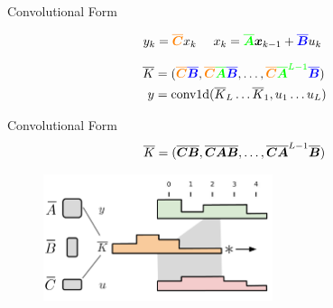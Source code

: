 \begin{frame}{Convolutional Form}

    \begin{align*}
    y_k =  \textcolor{orange}{\boldsymbol{\overline{C}}} x_{k \phantom{- 1}} \ 
    x_{k} = \textcolor{green}{\boldsymbol{\overline{A}}} \textcolor{black}{\boldsymbol{x}_{k-1}} + \textcolor{blue}{\boldsymbol{\overline{B}}} \textcolor{black}{u_k} \ 
    \end{align*}



\begin{align*}
\overline{K} &= (\textcolor{orange}{\boldsymbol{\overline{C}}}\textcolor{blue}{\boldsymbol{\overline{B}}}, \textcolor{orange}{\boldsymbol{\overline{C}}}\textcolor{green}{\boldsymbol{\overline{A}}}\textcolor{blue}{\boldsymbol{\overline{B}}}, \dots, \textcolor{orange}{\boldsymbol{\overline{C}}}\textcolor{green}{\boldsymbol{\overline{A}}^{L-1}}\textcolor{blue}{\boldsymbol{\overline{B}}}) \\
y &= \text{conv1d}(\overline{K}_L \ldots \overline{K}_1, u_1 \ldots u_L)
\end{align*}



\end{frame}


\begin{frame}{Convolutional Form}
\begin{align*}
\overline{K} &= (\textcolor{black}{\boldsymbol{\overline{C}}}\textcolor{black}{\boldsymbol{\overline{B}}}, \textcolor{black}{\boldsymbol{\overline{C}}}\textcolor{black}{\boldsymbol{\overline{A}}}\textcolor{black}{\boldsymbol{\overline{B}}}, \dots, \textcolor{black}{\boldsymbol{\overline{C}}}\textcolor{black}{\boldsymbol{\overline{A}}^{L-1}}\textcolor{black}{\boldsymbol{\overline{B}}}) \\
\end{align*}
\begin{figure}
    \centering
    \includegraphics[width=0.6\textwidth]{Figs/SSM (1).pdf}
    \label{fig:my_label}
\end{figure}
\end{frame}

